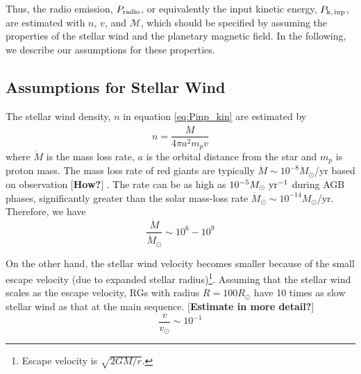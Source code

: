 \documentclass{emulateapj}
\def\memoYF#1{\color{red}$[${\bf #1}$]$ \color{black}}
\def\memoDS#1{\color{blue}$[${\bf #1}$]$ \color{black}}
\begin{document}
Thus, the radio emission, $P_{\rm radio}$, or equivalently the input kinetic energy, $P_{\rm k,\,inp}$, are estimated with $n$, $v$, and $\mathcal{M}$, which should be specified by assuming the properties of the stellar wind and the planetary magnetic field. 
In the following, we describe our assumptions for these properties. 







\subsection{Assumptions for Stellar Wind}
\label{ss:stellarwind}

The stellar wind density, $n$ in equation \ref{eq:Pinp_kin} are estimated by
\begin{equation}
n = \frac{\dot M}{4\pi a^2 m_p v}
\end{equation}
where $\dot M$ is the mass loss rate, $a$ is the orbital distance from the star and $m_p$ is proton mass. 
The mass loss rate of red giants are typically $\dot M \sim 10^{-8} M_{\odot}$/yr based on observation \memoYF{How?}. The rate can be as high as $10^{-5} M_\odot~{\rm yr^{-1}}$ during AGB phases, significantly greater than the solar mass-loss rate $\dot M_{\odot } \sim 10^{-14} M_{\odot}$/yr. 
Therefore, we have
\begin{equation}
\frac{\dot M}{\dot M_{\odot}} \sim 10^6 - 10^9
\end{equation}

On the other hand, the stellar wind velocity becomes smaller because of the small escape velocity (due to expanded stellar radius)\footnote{Escape velocity is $\sqrt{2GM/r}$.}. Assuming that the stellar wind scales as the escape velocity, RGs with radius $R=100R_{\odot}$ have 10 times as slow stellar wind as that at the main sequence. \memoYF{Estimate in more detail?}
\begin{equation}
\frac{v}{v_{\odot}} \sim 10^{-1}
\end{equation}
\end{document}
